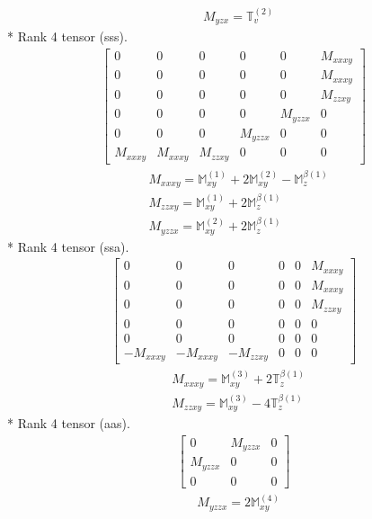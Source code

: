 \documentclass[fleqn,8pt,landscape]{jsarticle}
\begin{document}
\begin{align*}
& M_{yzx} = \mathbb{T}_{v}^{(2)}
\end{align*}
* Rank 4 tensor (sss).
\begin{align*}
\begin{bmatrix} 0 & 0 & 0 & 0 & 0 & M_{xxxy} \\ 0 & 0 & 0 & 0 & 0 & M_{xxxy} \\ 0 & 0 & 0 & 0 & 0 & M_{zzxy} \\ 0 & 0 & 0 & 0 & M_{yzzx} & 0 \\ 0 & 0 & 0 & M_{yzzx} & 0 & 0 \\ M_{xxxy} & M_{xxxy} & M_{zzxy} & 0 & 0 & 0 \end{bmatrix}
\end{align*}
\begin{align*}
& M_{xxxy} = \mathbb{M}_{xy}^{(1)} + 2 \mathbb{M}_{xy}^{(2)} - \mathbb{M}_{z}^{\beta(1)} \\
& M_{zzxy} = \mathbb{M}_{xy}^{(1)} + 2 \mathbb{M}_{z}^{\beta(1)} \\
& M_{yzzx} = \mathbb{M}_{xy}^{(2)} + 2 \mathbb{M}_{z}^{\beta(1)}
\end{align*}
* Rank 4 tensor (ssa).
\begin{align*}
\begin{bmatrix} 0 & 0 & 0 & 0 & 0 & M_{xxxy} \\ 0 & 0 & 0 & 0 & 0 & M_{xxxy} \\ 0 & 0 & 0 & 0 & 0 & M_{zzxy} \\ 0 & 0 & 0 & 0 & 0 & 0 \\ 0 & 0 & 0 & 0 & 0 & 0 \\ - M_{xxxy} & - M_{xxxy} & - M_{zzxy} & 0 & 0 & 0 \end{bmatrix}
\end{align*}
\begin{align*}
& M_{xxxy} = \mathbb{M}_{xy}^{(3)} + 2 \mathbb{T}_{z}^{\beta(1)} \\
& M_{zzxy} = \mathbb{M}_{xy}^{(3)} - 4 \mathbb{T}_{z}^{\beta(1)}
\end{align*}
* Rank 4 tensor (aas).
\begin{align*}
\begin{bmatrix} 0 & M_{yzzx} & 0 \\ M_{yzzx} & 0 & 0 \\ 0 & 0 & 0 \end{bmatrix}
\end{align*}
\begin{align*}
& M_{yzzx} = 2 \mathbb{M}_{xy}^{(4)}
\end{align*}
\end{document}
